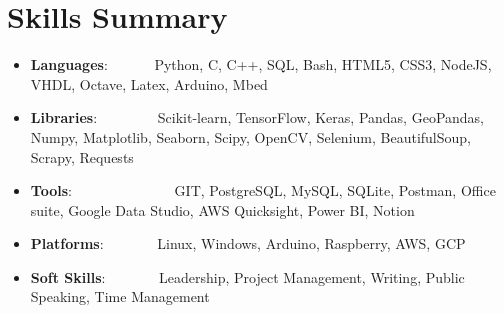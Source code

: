 \documentclass[a4paper,20pt]{article}
\newcommand{\resumeItem}[2]{
  \item\small{
    \textbf{#1}{: #2 \vspace{-2pt}}
  }
}
\newcommand{\resumeSubItem}[2]{\resumeItem{#1}{#2}\vspace{-3pt}}
\newcommand{\resumeSubHeadingListStart}{\begin{itemize}[leftmargin=*]}
\newcommand{\resumeSubHeadingListEnd}{\end{itemize}}
\begin{document}
\vspace{-5pt}
\section{Skills Summary}
	\resumeSubHeadingListStart
    \resumeSubItem{Languages}{~~~~~~Python, C, C++, SQL, Bash, HTML5, CSS3, NodeJS, VHDL, Octave, Latex, Arduino, Mbed}
    \resumeSubItem{Libraries}{~~~~~~~~Scikit-learn, TensorFlow, Keras, Pandas, GeoPandas, Numpy, Matplotlib, Seaborn, Scipy, OpenCV, Selenium, BeautifulSoup, Scrapy, Requests}
    \resumeSubItem{Tools}{~~~~~~~~~~~~~~GIT, PostgreSQL, MySQL, SQLite, Postman, Office suite, Google Data Studio, AWS Quicksight, Power BI, Notion}
    \resumeSubItem{Platforms}{~~~~~~~Linux, Windows, Arduino, Raspberry, AWS, GCP}
    \resumeSubItem{Soft Skills}{~~~~~~~Leadership, Project Management, Writing, Public Speaking, Time Management}
  \resumeSubHeadingListEnd
\vspace{-5pt}
\end{document}
